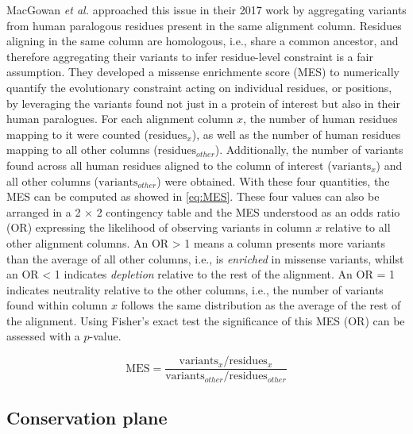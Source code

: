 MacGowan \textit{et al.} approached this issue in their 2017 work \cite{MACGOWAN_2017_VARIANTS} by aggregating variants from human paralogous residues present in the same alignment column. Residues aligning in the same column are homologous, i.e., share a common ancestor, and therefore aggregating their variants to infer residue-level constraint is a fair assumption. They developed a missense enrichmente score (MES) to numerically quantify the evolutionary constraint acting on individual residues, or positions, by leveraging the variants found not just in a protein of interest but also in their human paralogues. For each alignment column $x$, the number of human residues mapping to it were counted ($\text{residues}_x$), as well as the number of human residues mapping to all other columns ($\text{residues}_{other}$). Additionally, the number of variants found across all human residues aligned to the column of interest ($\text{variants}_x$) and all other columns ($\text{variants}_{other}$) were obtained. With these four quantities, the MES can be computed as showed in \autoref{eq:MES}. These four values can also be arranged in a 2 $\times$ 2 contingency table and the MES understood as an odds ratio (OR) expressing the likelihood of observing variants in column $x$ relative to all other alignment columns. An OR > 1 means a column presents more variants than the average of all other columns, i.e., is \textit{enriched} in missense variants, whilst an OR < 1 indicates \textit{depletion} relative to the rest of the alignment. An OR = 1 indicates neutrality relative to the other columns, i.e., the number of variants found within column $x$ follows the same distribution as the average of the rest of the alignment. Using Fisher's exact test \cite{FISHER_1935_TEST} the significance of this MES (OR) can be assessed with a $p$-value.

\begin{equation}
\text{MES} = \frac{\text{variants}_x / \text{residues}_x}{\text{variants}_{other} /\text{residues}_{other}}
\label{eq:MES}
\end{equation}

\vspace{-13pt} %
\vspace{-13pt} %

\subsection{Conservation plane}

